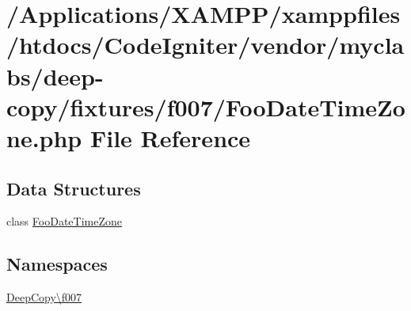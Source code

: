 \hypertarget{_foo_date_time_zone_8php}{}\section{/\+Applications/\+X\+A\+M\+P\+P/xamppfiles/htdocs/\+Code\+Igniter/vendor/myclabs/deep-\/copy/fixtures/f007/\+Foo\+Date\+Time\+Zone.php File Reference}
\label{_foo_date_time_zone_8php}
\subsection*{Data Structures}
\begin{DoxyCompactItemize}
\item 
class \mbox{\hyperlink{class_deep_copy_1_1f007_1_1_foo_date_time_zone}{Foo\+Date\+Time\+Zone}}
\end{DoxyCompactItemize}
\subsection*{Namespaces}
\begin{DoxyCompactItemize}
\item 
 \mbox{\hyperlink{namespace_deep_copy_1_1f007}{Deep\+Copy\textbackslash{}f007}}
\end{DoxyCompactItemize}
